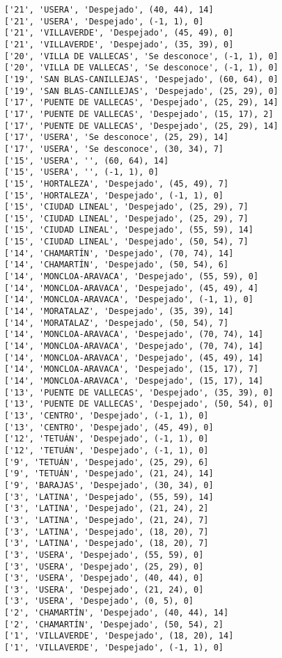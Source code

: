 \documentclass[11pt]{article}
\begin{document}
\begin{Verbatim}[commandchars=\\\{\}]
['21', 'USERA', 'Despejado', (40, 44), 14]
['21', 'USERA', 'Despejado', (-1, 1), 0]
['21', 'VILLAVERDE', 'Despejado', (45, 49), 0]
['21', 'VILLAVERDE', 'Despejado', (35, 39), 0]
['20', 'VILLA DE VALLECAS', 'Se desconoce', (-1, 1), 0]
['20', 'VILLA DE VALLECAS', 'Se desconoce', (-1, 1), 0]
['19', 'SAN BLAS-CANILLEJAS', 'Despejado', (60, 64), 0]
['19', 'SAN BLAS-CANILLEJAS', 'Despejado', (25, 29), 0]
['17', 'PUENTE DE VALLECAS', 'Despejado', (25, 29), 14]
['17', 'PUENTE DE VALLECAS', 'Despejado', (15, 17), 2]
['17', 'PUENTE DE VALLECAS', 'Despejado', (25, 29), 14]
['17', 'USERA', 'Se desconoce', (25, 29), 14]
['17', 'USERA', 'Se desconoce', (30, 34), 7]
['15', 'USERA', '', (60, 64), 14]
['15', 'USERA', '', (-1, 1), 0]
['15', 'HORTALEZA', 'Despejado', (45, 49), 7]
['15', 'HORTALEZA', 'Despejado', (-1, 1), 0]
['15', 'CIUDAD LINEAL', 'Despejado', (25, 29), 7]
['15', 'CIUDAD LINEAL', 'Despejado', (25, 29), 7]
['15', 'CIUDAD LINEAL', 'Despejado', (55, 59), 14]
['15', 'CIUDAD LINEAL', 'Despejado', (50, 54), 7]
['14', 'CHAMARTÍN', 'Despejado', (70, 74), 14]
['14', 'CHAMARTÍN', 'Despejado', (50, 54), 6]
['14', 'MONCLOA-ARAVACA', 'Despejado', (55, 59), 0]
['14', 'MONCLOA-ARAVACA', 'Despejado', (45, 49), 4]
['14', 'MONCLOA-ARAVACA', 'Despejado', (-1, 1), 0]
['14', 'MORATALAZ', 'Despejado', (35, 39), 14]
['14', 'MORATALAZ', 'Despejado', (50, 54), 7]
['14', 'MONCLOA-ARAVACA', 'Despejado', (70, 74), 14]
['14', 'MONCLOA-ARAVACA', 'Despejado', (70, 74), 14]
['14', 'MONCLOA-ARAVACA', 'Despejado', (45, 49), 14]
['14', 'MONCLOA-ARAVACA', 'Despejado', (15, 17), 7]
['14', 'MONCLOA-ARAVACA', 'Despejado', (15, 17), 14]
['13', 'PUENTE DE VALLECAS', 'Despejado', (35, 39), 0]
['13', 'PUENTE DE VALLECAS', 'Despejado', (50, 54), 0]
['13', 'CENTRO', 'Despejado', (-1, 1), 0]
['13', 'CENTRO', 'Despejado', (45, 49), 0]
['12', 'TETUÁN', 'Despejado', (-1, 1), 0]
['12', 'TETUÁN', 'Despejado', (-1, 1), 0]
['9', 'TETUÁN', 'Despejado', (25, 29), 6]
['9', 'TETUÁN', 'Despejado', (21, 24), 14]
['9', 'BARAJAS', 'Despejado', (30, 34), 0]
['3', 'LATINA', 'Despejado', (55, 59), 14]
['3', 'LATINA', 'Despejado', (21, 24), 2]
['3', 'LATINA', 'Despejado', (21, 24), 7]
['3', 'LATINA', 'Despejado', (18, 20), 7]
['3', 'LATINA', 'Despejado', (18, 20), 7]
['3', 'USERA', 'Despejado', (55, 59), 0]
['3', 'USERA', 'Despejado', (25, 29), 0]
['3', 'USERA', 'Despejado', (40, 44), 0]
['3', 'USERA', 'Despejado', (21, 24), 0]
['3', 'USERA', 'Despejado', (0, 5), 0]
['2', 'CHAMARTÍN', 'Despejado', (40, 44), 14]
['2', 'CHAMARTÍN', 'Despejado', (50, 54), 2]
['1', 'VILLAVERDE', 'Despejado', (18, 20), 14]
['1', 'VILLAVERDE', 'Despejado', (-1, 1), 0]

\end{Verbatim}
\end{document}
